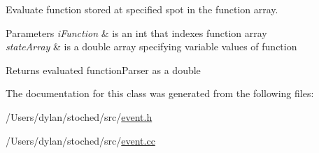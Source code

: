 Evaluate function stored at specified spot in the function array. 


\begin{DoxyParams}{Parameters}
{\em i\+Function} & is an int that indexes function array \\
\hline
{\em state\+Array} & is a double array specifying variable values of function \\
\hline
\end{DoxyParams}
\begin{DoxyReturn}{Returns}
evaluated function\+Parser as a double 
\end{DoxyReturn}


The documentation for this class was generated from the following files\+:\begin{DoxyCompactItemize}
\item 
/\+Users/dylan/stoched/src/\hyperlink{event_8h}{event.\+h}\item 
/\+Users/dylan/stoched/src/\hyperlink{event_8cc}{event.\+cc}\end{DoxyCompactItemize}
